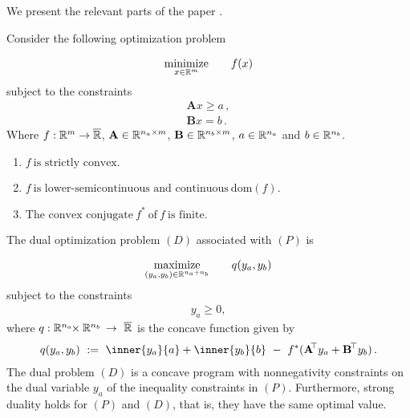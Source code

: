 We present the relevant parts of the paper \cite{Bertsekas2003}.

Consider the following optimization problem

  \begin{gather*}
    \underset{x\in \mathbb{R}^m}{\mathrm{minimize}}
    \qquad
    f(x)
  \end{gather*}
subject to the constraints
\begin{gather}
  \mathbf{A}x \ge a\,,
  \\
  \mathbf{B}x = b\,.
\end{gather}
Where 
$
  f:
  \R^m
  \to 
  \overline{\R}
  $, 
  $
  \mathbf{A} 
  \in 
  \mathbb{R}^{n_a\times m}
$, 
$
  \mathbf{B} 
  \in 
  \mathbb{R}^{n_b\times m}
$, 
$
a\in \mathbb{R}^{n_a}
$
and 
$
b\in \mathbb{R}^{n_b}
$.
\begin{assumption}
  \begin{enumerate}[label={(\roman*)}]
    Assume that the map 
    $
      f: \R^m \to \overline{\R}
    $
    has the following properties.
    \item
      $
        f 
        \ 
        \text{is strictly convex.}
      $
    \item
      $
        f
        \ 
        \text{is lower-semicontinuous and continuous}
        \ 
        \mathrm{dom}(f)
        .
      $
    \item
      $
        \text{The convex conjugate}
        \ 
        f^*
        \ 
        \text{of}\ 
        f
        \ 
        \text{is finite}
        .
      $
  \end{enumerate}
\end{assumption}

The dual optimization problem $(D)$ associated with $(P)$
is 


  \begin{gather*}
    \underset{
      (y_a,y_b)\in \mathbb{R}^{n_a+n_b}
    }{\mathrm{maximize}}
    \qquad
    q(y_{a},y_{b})
  \end{gather*}
subject to the constraints
\begin{gather}
  y_a \ge 0
  ,
\end{gather}
where 
$
q: \mathbb{R}^{n_a}\!\!\times\mathbb{R}^{n_b}\, \to\  \overline{\mathbb{R}}
$
is the concave function given by
\begin{gather}
  q(y_a,y_b)
  \ 
  :=
  \ 
  \inner{y_a}{a}
  +
  \inner{y_b}{b}
  \ 
  -
  \ 
  f^*(
    \mathbf{A}^{\!\!\top}y_a
    +
    \mathbf{B}^{\!\top} y_b 
  )
  \,
  .
\end{gather}
The dual problem $(D)$ is a concave program
with nonnegativity constraints on the dual variable $y_a$
of the inequality constraints in $(P)$.
Furthermore, strong duality holds for $(P)$ and $(D)$,
that is, they have the same optimal value.

